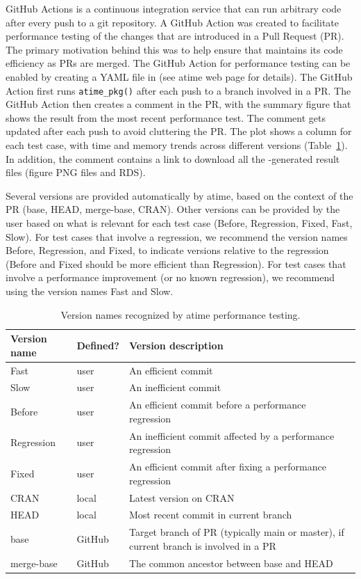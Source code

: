 GitHub Actions is a continuous integration service that can run arbitrary code after every push to a git repository.
A GitHub Action was created to facilitate performance testing of the changes that are introduced in a Pull Request (PR). 
The primary motivation behind this was to help ensure that  maintains its code efficiency as PRs are merged.
The GitHub Action for performance testing can be enabled by creating a YAML file in  (see atime web page for details).
The GitHub Action first runs \verb|atime_pkg()| after each push to a branch involved in a PR.
The GitHub Action then creates a comment in the PR, with the summary figure that shows the result from the most recent performance test.
The comment gets updated after each push to avoid cluttering the PR.
The plot shows a column for each test case, with time and memory trends across different  versions (Table~\ref{tab:version-labels}).
In addition, the comment contains a link to download all the -generated result files (figure PNG files and RDS).

Several versions are provided automatically by atime, based on the context of the PR (base, HEAD, merge-base, CRAN).
Other versions can be provided by the user based on what is relevant for each test case (Before, Regression, Fixed, Fast, Slow).
For test cases that involve a regression, we recommend the version names Before, Regression, and Fixed, to indicate versions relative to the regression (Before and Fixed should be more efficient than Regression).
For test cases that involve a performance improvement (or no known regression), we recommend using the version names Fast and Slow.
\begin{table}[t]
        \centering
            \caption{\label{tab:version-labels}Version names recognized by atime performance testing. }
        \begin{tabular}    
        {|m{2.2cm}|m{1.5cm}|m{9cm}|}
  \hline
      \textbf{Version name} & \textbf{Defined?} & \textbf{Version description} \\
  \hline
  Fast & user & An efficient commit \\
  \hline
  Slow & user & An inefficient commit\\
  \hline
  Before & user & An efficient commit before a performance regression  \\
  \hline
  Regression & user & An inefficient commit affected by a performance regression \\
  \hline  
   Fixed & user & An efficient commit after fixing a performance regression \\
  \hline  
  CRAN & local & Latest version on CRAN  \\
  \hline
  HEAD & local &  Most recent commit in current branch \\
  \hline
  base & GitHub & Target branch of PR (typically main or master), if current branch is involved in a PR \\
  \hline
  merge-base & GitHub & The common ancestor between base and HEAD \\
  \hline
    \end{tabular}
\end{table}

